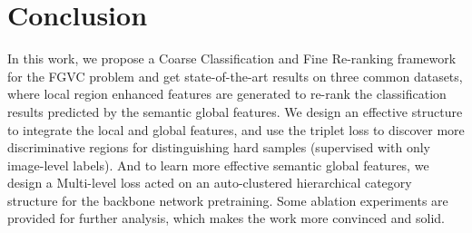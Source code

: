 \documentclass[10pt,twocolumn,letterpaper]{article}
\begin{document}
\section{Conclusion}
In this work, we propose a Coarse Classification and Fine Re-ranking framework for the FGVC problem and get state-of-the-art results on three common datasets, where local region enhanced features are generated to re-rank the  classification results predicted by the semantic global features. We design an effective structure to integrate the local and global features, and use the triplet loss to discover more discriminative regions for distinguishing hard samples (supervised with only image-level labels). And to learn more effective semantic global features, we design a Multi-level loss acted on an auto-clustered hierarchical category structure for the backbone network pretraining. Some ablation experiments are provided for further analysis, which makes the work more convinced and solid.







{\small


}
\end{document}
